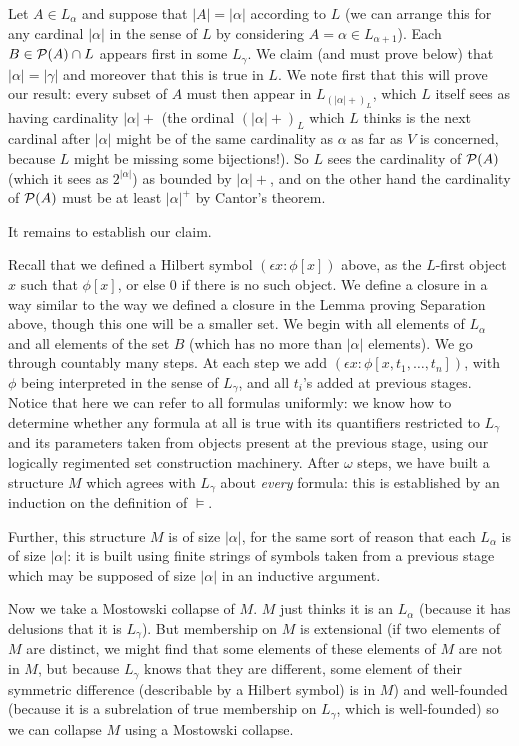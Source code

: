 \documentclass[12pt]{book}
\begin{document}
Let $A \in L_{\alpha}$ and suppose that $|A|=|\alpha|$ according to $L$ (we can arrange this for any cardinal $|\alpha|$ in the sense of $L$ by considering $A=\alpha \in L_{\alpha+1}$).  Each $B \in {\cal P}(A) \cap L$ appears first in some $L_{\gamma}$.  We claim (and must prove below) that $|\alpha|=|\gamma|$ and moreover that this is true in $L$.  We note first that this will prove our result:  every subset of $A$ must then appear in $L_{(|\alpha|+)_L}$, which $L$ itself sees as having cardinality $|\alpha|+$ (the ordinal $(|\alpha|+)_L$ which $L$ thinks is the next cardinal after $|\alpha|$ might be of the same cardinality as $\alpha$ as far as $V$ is concerned, because $L$ might be missing some bijections!).  So $L$ sees the cardinality of ${\cal P}(A)$ (which it sees as $2^{|\alpha|}$) as bounded
by $|\alpha|+$, and on the other hand the cardinality of ${\cal P}(A)$ must be at least $|\alpha|^+$ by Cantor's theorem.

It remains to establish our claim.

Recall that we defined a Hilbert symbol  $(\epsilon x:\phi[x])$ above, as the $L$-first object $x$ such that $\phi[x]$, or else 0 if there is no such object.  We define a closure in a way similar to the way we defined a closure in the Lemma proving Separation above, though this one will be a smaller set.  We begin with all elements of $L_{\alpha}$ and all elements of the set $B$
(which has no more than $|\alpha|$ elements).  We go through countably many steps.  At each step we add $(\epsilon x:\phi[x,t_1,\ldots,t_n])$, with $\phi$ being interpreted in the sense
of $L_{\gamma}$, and all $t_i$'s added at previous stages.  Notice that here we can refer to all formulas uniformly:  we know how to determine whether any formula at all is true with its quantifiers restricted to $L_{\gamma}$ and its parameters taken from objects present at the previous stage, using our logically regimented set construction machinery.   After $\omega$ steps, we have built a structure $M$ which agrees with $L_{\gamma}$ about {\em every} formula:  this is established by an induction on the definition of $\models$.

Further,
this structure $M$ is of size $|\alpha|$, for the same sort of reason that each $L_{\alpha}$ is of size $|\alpha|$:  it is built using finite strings of symbols taken from a previous stage which may be supposed of size $|\alpha|$ in an inductive argument.

Now we take a Mostowski collapse of $M$.  $M$ just thinks it is an $L_{\alpha}$ (because it has delusions that it is $L_{\gamma}$).  But membership on $M$ is extensional (if two elements of $M$ are distinct, we might find that some elements of these elements of $M$ are not in $M$, but because $L_{\gamma}$ knows that they are different, some element of their symmetric difference (describable by a Hilbert symbol) is in $M$) and well-founded (because it is a subrelation of true membership on $L_{\gamma}$, which is well-founded) so we can collapse $M$ using a Mostowski collapse.
\end{document}
